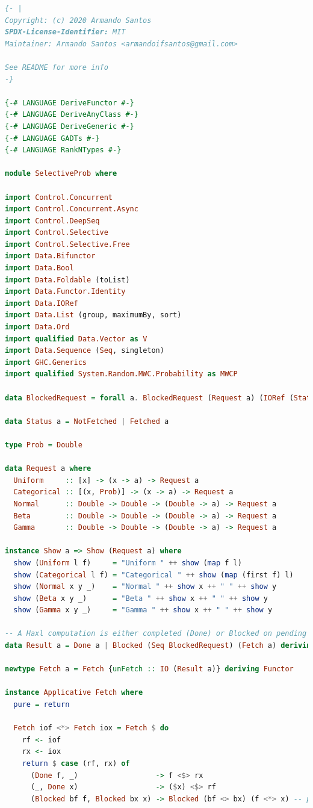 \documentclass[
  oneside,
  11pt, a4paper,
  footinclude=true,
  headinclude=true,
  cleardoublepage=empty
]{scrbook}
\theoremstyle{definition}
\theoremstyle{definition}
\begin{document}
    \begin{lstlisting}[language=Haskell, caption={SelectiveProb.hs},captionpos=b]
{- |
Copyright: (c) 2020 Armando Santos
SPDX-License-Identifier: MIT
Maintainer: Armando Santos <armandoifsantos@gmail.com>

See README for more info
-}

{-# LANGUAGE DeriveFunctor #-}
{-# LANGUAGE DeriveAnyClass #-}
{-# LANGUAGE DeriveGeneric #-}
{-# LANGUAGE GADTs #-}
{-# LANGUAGE RankNTypes #-}

module SelectiveProb where

import Control.Concurrent
import Control.Concurrent.Async
import Control.DeepSeq
import Control.Selective
import Control.Selective.Free
import Data.Bifunctor
import Data.Bool
import Data.Foldable (toList)
import Data.Functor.Identity
import Data.IORef
import Data.List (group, maximumBy, sort)
import Data.Ord
import qualified Data.Vector as V
import Data.Sequence (Seq, singleton)
import GHC.Generics
import qualified System.Random.MWC.Probability as MWCP

data BlockedRequest = forall a. BlockedRequest (Request a) (IORef (Status a))

data Status a = NotFetched | Fetched a

type Prob = Double

data Request a where
  Uniform     :: [x] -> (x -> a) -> Request a
  Categorical :: [(x, Prob)] -> (x -> a) -> Request a
  Normal      :: Double -> Double -> (Double -> a) -> Request a
  Beta        :: Double -> Double -> (Double -> a) -> Request a
  Gamma       :: Double -> Double -> (Double -> a) -> Request a

instance Show a => Show (Request a) where
  show (Uniform l f)     = "Uniform " ++ show (map f l)
  show (Categorical l f) = "Categorical " ++ show (map (first f) l)
  show (Normal x y _)    = "Normal " ++ show x ++ " " ++ show y
  show (Beta x y _)      = "Beta " ++ show x ++ " " ++ show y
  show (Gamma x y _)     = "Gamma " ++ show x ++ " " ++ show y

-- A Haxl computation is either completed (Done) or Blocked on pending data requests
data Result a = Done a | Blocked (Seq BlockedRequest) (Fetch a) deriving Functor

newtype Fetch a = Fetch {unFetch :: IO (Result a)} deriving Functor

instance Applicative Fetch where
  pure = return

  Fetch iof <*> Fetch iox = Fetch $ do
    rf <- iof
    rx <- iox
    return $ case (rf, rx) of
      (Done f, _)                  -> f <$> rx
      (_, Done x)                  -> ($x) <$> rf
      (Blocked bf f, Blocked bx x) -> Blocked (bf <> bx) (f <*> x) -- parallelism


\end{lstlisting}
\end{document}
